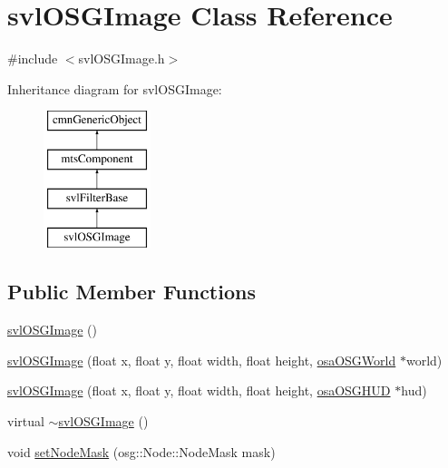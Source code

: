 \hypertarget{classsvl_o_s_g_image}{\section{svl\-O\-S\-G\-Image Class Reference}
\label{classsvl_o_s_g_image}
}


{\ttfamily \#include $<$svl\-O\-S\-G\-Image.\-h$>$}

Inheritance diagram for svl\-O\-S\-G\-Image\-:\begin{figure}[H]
\begin{center}
\leavevmode
\includegraphics[height=4.000000cm]{d4/d6e/classsvl_o_s_g_image}
\end{center}
\end{figure}
\subsection*{Public Member Functions}
\begin{DoxyCompactItemize}
\item 
\hyperlink{classsvl_o_s_g_image_a82b755e82f32a0a399697909d94d908b}{svl\-O\-S\-G\-Image} ()
\item 
\hyperlink{classsvl_o_s_g_image_af502581baddb0f29320e3cee836f20b6}{svl\-O\-S\-G\-Image} (float x, float y, float width, float height, \hyperlink{classosa_o_s_g_world}{osa\-O\-S\-G\-World} $\ast$world)
\item 
\hyperlink{classsvl_o_s_g_image_a7c862299dfc4ffeb94fb50995fcdf6b8}{svl\-O\-S\-G\-Image} (float x, float y, float width, float height, \hyperlink{classosa_o_s_g_h_u_d}{osa\-O\-S\-G\-H\-U\-D} $\ast$hud)
\item 
virtual \hyperlink{classsvl_o_s_g_image_a8e28cdd761d29eaf4563252cf906935b}{$\sim$svl\-O\-S\-G\-Image} ()
\item 
void \hyperlink{classsvl_o_s_g_image_a23794ac22b15a36a63ed225a86b5af5e}{set\-Node\-Mask} (osg\-::\-Node\-::\-Node\-Mask mask)
\end{DoxyCompactItemize}
